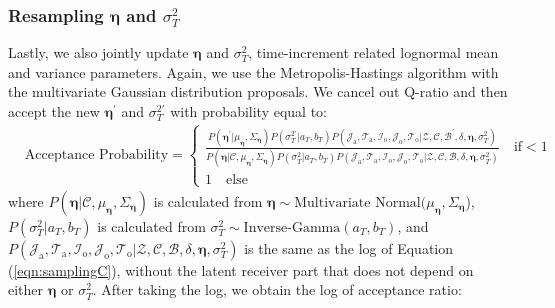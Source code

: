   \subsubsection{Resampling $\boldsymbol{\eta}$ and $\sigma_T^2$}  \label{subsec: Resampling eta}
     Lastly, we also jointly update $\boldsymbol{\eta}$ and $\sigma_T^2$, time-increment related lognormal mean and variance parameters. Again, we use the Metropolis-Hastings algorithm with the multivariate Gaussian distribution proposals. We cancel out Q-ratio and then accept the new $\boldsymbol{\eta}^\prime$ and $\sigma_T^{2\prime}$ with probability equal to:
    \begin{equation}
    \begin{split}
    & \mbox{Acceptance Probability}=
    \begin{cases}  \frac{P(\boldsymbol{\eta}^\prime|\mu_{\boldsymbol{\eta}}, \Sigma_{\boldsymbol{\eta}})P(\sigma_T^{2\prime}|a_T, b_T)P(\mathcal{J}_{\mbox{a}},\mathcal{T}_{\mbox{a}}, \mathcal{I}_{\mbox{o}}, \mathcal{J}_{\mbox{o}}, \mathcal{T}_{\mbox{o}} |\mathcal{Z}, \mathcal{C}, \mathcal{B}^\prime, \delta, \boldsymbol{\eta}, \sigma_T^2)}{P(\boldsymbol{\eta}|\mathcal{C}, \mu_{\boldsymbol{\eta}}, \Sigma_{\boldsymbol{\eta}})P( \sigma_T^{2}|a_T, b_T)P(\mathcal{J}_{\mbox{a}},\mathcal{T}_{\mbox{a}}, \mathcal{I}_{\mbox{o}}, \mathcal{J}_{\mbox{o}}, \mathcal{T}_{\mbox{o}} |\mathcal{Z}, \mathcal{C}, \mathcal{B}, \delta,\boldsymbol{\eta}, \sigma_T^2)}\quad\text{if}  <1\\
    1 \quad \text{else}
    \end{cases}
    \end{split}
    \end{equation}
    where $P(\boldsymbol{\eta}|\mathcal{C}, \mu_{\boldsymbol{\eta}}, \Sigma_{\boldsymbol{\eta}})$ is calculated from $\boldsymbol{\eta}\sim \mbox{Multivariate Normal}(\mu_{\boldsymbol{\eta}}, \Sigma_{\boldsymbol{\eta}}$),  $P( \sigma_T^{2}|a_T, b_T)$ is calculated from $\sigma_T^2 \sim \mbox{Inverse-Gamma}(a_T, b_T)$, and $P(\mathcal{J}_{\mbox{a}}, \mathcal{T}_{\mbox{a}},\mathcal{I}_{\mbox{o}}, \mathcal{J}_{\mbox{o}}, \mathcal{T}_{\mbox{o}} |\mathcal{Z}, \mathcal{C}, \mathcal{B}, \delta, \boldsymbol{\eta}, \sigma_T^2)$ is the same as the log of Equation (\ref{eqn:samplingC}), without the latent receiver part that does not depend on either $\boldsymbol{\eta}$ or $\sigma_T^2$. After taking the log, we obtain the log of acceptance ratio:
